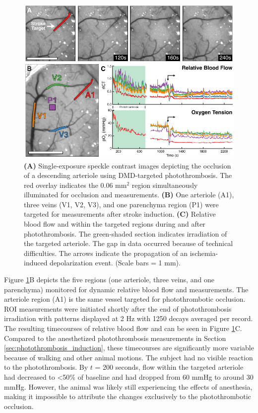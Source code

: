 \begin{figure}
    \includegraphics{figures/chapter_5/acuteawakephotothrombosis.pdf}
    \caption{
        \label{fig:acuteawakephotothrombosis}
        \textbf{(A)} Single-exposure speckle contrast images depicting the occlusion of a descending arteriole using DMD-targeted photothrombosis. The red overlay indicates the 0.06 mm$^2$ region simultaneously illuminated for occlusion and  measurements. \textbf{(B)} One arteriole (A1), three veins (V1, V2, V3), and one parenchyma region (P1) were targeted for  measurements after stroke induction. \textbf{(C)} Relative blood flow and  within the targeted regions during and after photothrombosis. The green-shaded section indicates irradiation of the targeted arteriole. The gap in data occurred because of technical difficulties. The arrows indicate the propagation of an ischemia-induced depolarization event. (Scale bars = 1 mm).
    }
\end{figure}

Figure \ref{fig:acuteawakephotothrombosis}B depicts the five regions (one arteriole, three veins, and one parenchyma) monitored for dynamic relative blood flow and  measurements. The arteriole region (A1) is the same vessel targeted for photothrombotic occlusion. ROI  measurements were initiated shortly after the end of photothrombosis irradiation with patterns displayed at 2 Hz with 1250 decays averaged per record. The resulting timecourses of relative blood flow and  can be seen in Figure \ref{fig:acuteawakephotothrombosis}C. Compared to the anesthetized photothrombosis measurements in Section \ref{sec:photothrombosis_induction}, these timecourses are significantly more variable because of walking and other animal motions. The subject had no visible reaction to the photothrombosis. By $t$ = 200 seconds, flow within the targeted arteriole had decreased to \textless50\% of baseline and  had dropped from 60 mmHg to around 30 mmHg. However, the animal was likely still experiencing the effects of anesthesia, making it impossible to attribute the changes exclusively to the photothrombotic occlusion.

